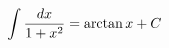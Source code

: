 \documentclass[preview]{standalone}
\begin{document}
\begin{align*}
\special{dvisvgm:raw <g id='unique000'>}\int \frac{dx}{1+x^2} = \arctan x + C\special{dvisvgm:raw </g>}
\end{align*}
\end{document}
